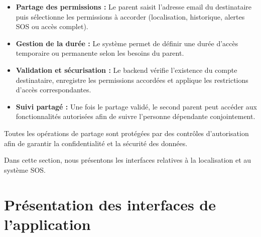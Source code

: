 \begin{itemize}
\item \textbf{Partage des permissions :} Le parent saisit l’adresse email du destinataire puis
sélectionne les permissions à accorder (localisation, historique, alertes SOS ou accès complet).

\item \textbf{Gestion de la durée :} Le système permet de définir une durée d’accès temporaire
ou permanente selon les besoins du parent.

\item \textbf{Validation et sécurisation :} Le backend vérifie l’existence du compte destinataire,
enregistre les permissions accordées et applique les restrictions d’accès correspondantes.

\item \textbf{Suivi partagé :} Une fois le partage validé, le second parent peut accéder aux
fonctionnalités autorisées afin de suivre l’personne dépendante conjointement.
\end{itemize}

Toutes les opérations de partage sont protégées par des contrôles d’autorisation afin de garantir
la confidentialité et la sécurité des données.

Dans cette section, nous présentons les interfaces relatives à la localisation et au système SOS.


\section{Présentation des interfaces de l'application}


